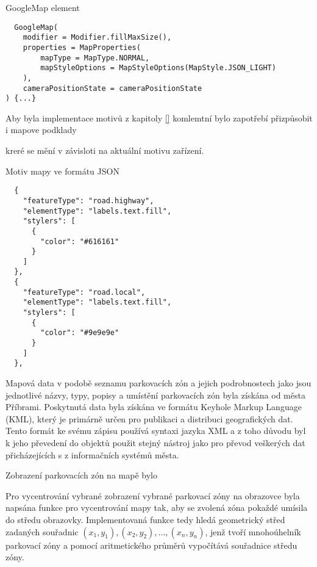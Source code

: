 
\begin{listing}[H]
\caption{GoogleMap element}\label{lst:GoogleMapview}
\begin{verbatim}
  GoogleMap(
    modifier = Modifier.fillMaxSize(),
    properties = MapProperties(
        mapType = MapType.NORMAL,
        mapStyleOptions = MapStyleOptions(MapStyle.JSON_LIGHT)
    ),
    cameraPositionState = cameraPositionState
) {...}
\end{verbatim}
\end{listing}


Aby byla implementace motivů z kapitoly \ref{} komlemtní bylo zapotřebí přizpůsobit i mapove podklady

kreré se mění v závisloti na aktuální motivu zařízení.
\begin{listing}[H]
\caption{Motiv mapy ve formátu JSON}\label{lst:MapStyle}
\begin{verbatim}
  {
    "featureType": "road.highway",
    "elementType": "labels.text.fill",
    "stylers": [
      {
        "color": "#616161"
      }
    ]
  },
  {
    "featureType": "road.local",
    "elementType": "labels.text.fill",
    "stylers": [
      {
        "color": "#9e9e9e"
      }
    ]
  },
\end{verbatim}
\end{listing}

Mapová data v podobě seznamu parkovacích zón a jejich podrobnostech jako jsou jednotlivé názvy, typy, popisy a umístění parkovacích zón byla 
získána od města Příbrami. Poskytnutá data byla získána ve formátu Keyhole Markup Language (KML), který je primárně určen pro publikaci a 
distribuci geografických dat. Tento formát ke svému zápisu používá syntaxi jazyka XML a z toho důvodu byl k jeho převedení do objektů 
použit stejný nástroj jako pro převod veškerých dat přicházejících s z informačních systémů města.

Zobrazení parkovacích zón na mapě bylo 

Pro vycentrování vybrané zobrazení vybrané parkovací zóny na obrazovce byla napsána funkce pro vycentrování mapy tak, aby se zvolená zóna pokaždé 
umísila do středu obrazovky. Implementovaná funkce tedy hledá geometrický střed zadaných souřadnic \( (x_1, y_1), (x_2, y_2), ..., (x_n, y_n)\), 
jenž tvoří mnohoúhelník parkovací zóny a pomocí aritmetického průměrů vypočítává souřadnice středu zóny.

